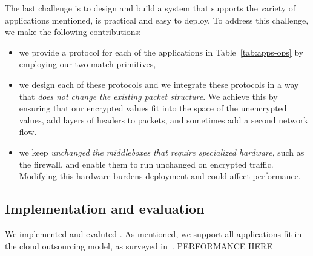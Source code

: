 The last challenge is to design and build a system that supports the variety of applications mentioned, is practical and easy to deploy. 
To address this challenge, we make the following contributions:
\begin{itemize}
\item we provide a  protocol for each of the applications in Table~\ref{tab:apps-ops} by employing our two match  primitives,
\item we design each of these protocols and we integrate these protocols in a way that {\em does not change the existing packet structure}. We achieve this by ensuring that our encrypted values fit into the space of the unencrypted values, add layers of headers to packets, and sometimes add a second network flow.
\item  we keep {\em unchanged  the middleboxes that require specialized hardware}, such as the firewall, and enable them to run unchanged on encrypted traffic. Modifying this hardware burdens deployment and could affect performance. 
\end{itemize}


\subsection{Implementation and evaluation}

We implemented and evaluted \sys. As mentioned, we support all applications fit in the cloud outsourcing model, as surveyed in~\cite{aplomb}. PERFORMANCE HERE
